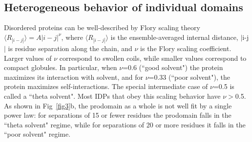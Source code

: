 \documentclass[10pt,letterpaper]{article}
\begin{document}
\subsection{Heterogeneous behavior of individual domains}

Disordered proteins can be well-described by Flory scaling theory $\langle R_{|i-j|}\rangle = A|i-j|^{\nu}$, where $\langle R_{|i-j|}\rangle$ is the ensemble-averaged internal distance, $|$i-j$|$ is residue separation along the chain, and $\nu$ is the Flory scaling coefficient\cite{Flory1949}. Larger values of $\nu$ correspond to swollen coils, while smaller values correspond to compact globules\cite{Das2013a}. In particular, when $\nu$=0.6 (``good solvent") the protein maximizes its interaction with solvent, and for $\nu$=0.33 (``poor solvent"), the protein maximizes self-interactions. The special intermediate case of $\nu$=0.5 is called a ``theta solvent"\cite{Flory1949}. Most IDPs that obey this scaling behavior have $\nu$$>$0.5\cite{Hofmann2012,Das2013a,Zerze2015,Meng2018}. As shown in Fig~\ref{fig3}b, the prodomain as a whole is not well fit by a single power law: for separations of 15 or fewer residues the prodomain falls in the ``theta solvent" regime, while for separations of 20 or more residues it falls in the ``poor solvent" regime.
\end{document}
